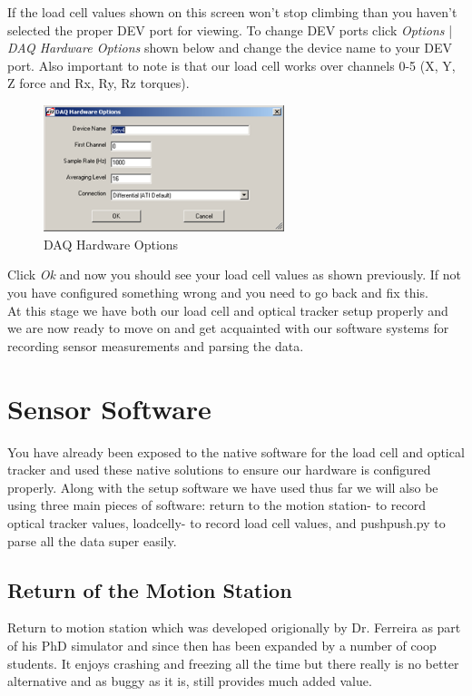 \documentclass[pdftex,11pt,letterpaper]{article}
\begin{document}
If the load cell values shown on this screen won’t stop climbing than you haven’t selected the proper DEV port for viewing. To change DEV ports click \textit{Options} | \textit{DAQ Hardware Options} shown below and change the device name to your DEV port. Also important to note is that our load cell works over channels 0-5 (X, Y, Z force and Rx, Ry, Rz torques). \\

\begin{figure}[ht!]
\centering
\includegraphics[width=70mm]{./images/dev_p}
\caption{DAQ Hardware Options}
\end{figure}

Click \textit{Ok} and now you should see your load cell values as shown previously. If not you have configured something wrong and you need to go back and fix this. \\

At this stage we have both our load cell and optical tracker setup properly and we are now ready to move on and get acquainted with our software systems for recording sensor measurements and parsing the data.  


\section{Sensor Software}

You have already been exposed to the native software for the load cell and optical tracker and used these native solutions to ensure our hardware is configured properly. Along with the setup software we have used thus far we will also be using three main pieces of software: return to the motion station- to record optical tracker values, loadcelly- to record load cell values, and pushpush.py to parse all the data super easily. \\

\subsection{Return of the Motion Station}
Return to motion station which was developed origionally by Dr. Ferreira as part of his PhD simulator and since then has been expanded by a number of coop students. It enjoys crashing and freezing all the time but there really is no better alternative and as buggy as it is, still provides much added value. \\
\end{document}
